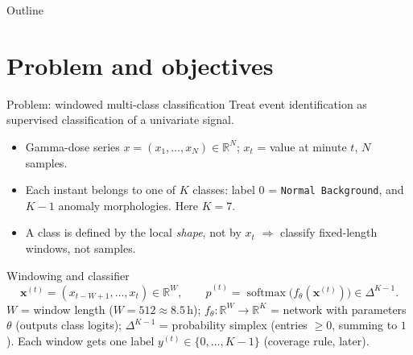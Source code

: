 \documentclass[11pt, aspectratio=169]{beamer}
\newcommand{\R}{\mathbb{R}}
\newcommand{\softmax}{\operatorname{softmax}}
\begin{document}
\begin{frame}{Outline}
  \tableofcontents
\end{frame}

\section{Problem and objectives}

\begin{frame}{Problem: windowed multi-class classification}
  Treat event identification as \alert{supervised classification of a univariate
  signal}.
  \begin{itemize}
    \item Gamma-dose series $x = (x_1,\dots,x_N) \in \R^{N}$; $x_t$ = value at
          minute $t$, $N$ samples.
    \item Each instant belongs to one of $K$ classes: label $0$ =
          \texttt{Normal Background}, and $K-1$ anomaly morphologies. Here
          $K = 7$.
    \item A class is defined by the local \emph{shape}, not by $x_t$
          $\Rightarrow$ classify \alert{fixed-length windows}, not samples.
  \end{itemize}
  \begin{block}{Windowing and classifier}
    \[
      \mathbf{x}^{(t)} = (x_{t-W+1},\dots,x_t) \in \R^{W},
      \qquad
      \hat{p}^{(t)} = \softmax\!\big(f_\theta(\mathbf{x}^{(t)})\big) \in \Delta^{K-1}.
    \]
    {\footnotesize
     $W$ = window length ($W=512 \approx 8.5$\,h); $f_\theta:\R^{W}\!\to\R^{K}$ =
     network with parameters $\theta$ (outputs class logits);
     $\Delta^{K-1}$ = probability simplex (entries $\ge 0$, summing to $1$).
     Each window gets one label $y^{(t)}\in\{0,\dots,K-1\}$ (coverage rule, later).}
  \end{block}
\end{frame}
\end{document}
